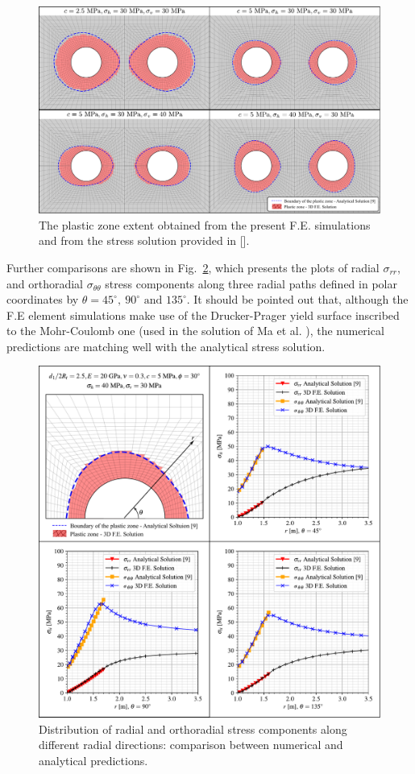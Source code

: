 \documentclass[a4paper,fleqn]{cas-sc}
\begin{document}
\begin{figure}[h!]
	\centering
	\includegraphics[scale=0.7]{MA_Comparisions_plastic_zones.pdf}
	\caption{The plastic zone extent obtained from the present F.E. simulations and from the stress solution provided in [].}
	\label{MA_FIG1}
\end{figure}
\FloatBarrier
Further comparisons are shown in Fig.~\ref{MA_stresspaths}, which presents the plots of radial $\sigma_{rr}$, and orthoradial $\sigma_{\theta \theta}$ stress components along three radial paths defined in polar coordinates by $\theta = 45^\circ,~90^\circ \text{~and~} 135^\circ$. It should be pointed out that, although the F.E element simulations make use of the Drucker-Prager yield surface inscribed to the Mohr-Coulomb one (used in the solution of Ma et al. ), the numerical predictions are matching well with the analytical stress solution.

\begin{figure}[h!]
	\centering
	\includegraphics[scale=0.6]{MA_stresspaths.pdf}
	\caption{Distribution of radial and orthoradial stress components along different radial directions: comparison between numerical and analytical predictions.}
	\label{MA_stresspaths}
\end{figure}
\FloatBarrier
\end{document}

